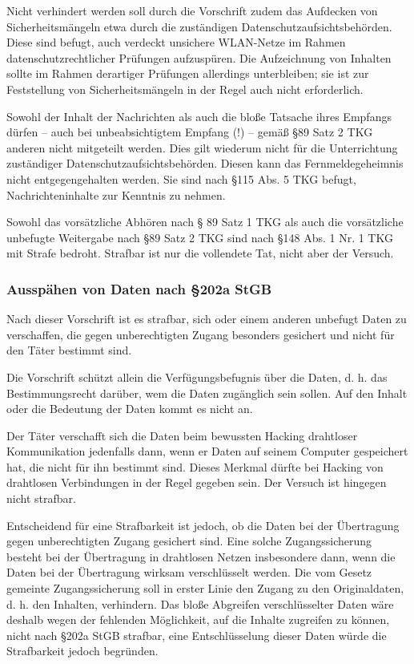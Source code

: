 \documentclass[10pt,a4paper]{article}
\begin{document}
Nicht verhindert werden soll durch die Vorschrift zudem das Aufdecken von Sicherheitsmängeln etwa durch die zuständigen Datenschutzaufsichtsbehörden. Diese sind befugt, auch verdeckt unsichere WLAN-Netze im Rahmen datenschutzrechtlicher Prüfungen aufzuspüren. Die Aufzeichnung von Inhalten sollte im Rahmen derartiger Prüfungen allerdings unterbleiben; sie ist zur Feststellung von Sicherheitsmängeln in der Regel auch nicht erforderlich.

Sowohl der Inhalt der Nachrichten als auch die bloße Tatsache ihres Empfangs dürfen – auch bei unbeabsichtigtem Empfang (!) – gemäß §89 Satz 2 TKG anderen nicht mitgeteilt werden. Dies gilt wiederum nicht für die Unterrichtung zuständiger Datenschutzaufsichtsbehörden. Diesen kann das Fernmeldegeheimnis nicht entgegengehalten werden. Sie sind nach §115 Abs. 5 TKG befugt, Nachrichteninhalte zur Kenntnis zu nehmen.

Sowohl das vorsätzliche Abhören nach § 89 Satz 1 TKG als auch die vorsätzliche unbefugte Weitergabe nach §89 Satz 2 TKG sind nach §148 Abs. 1 Nr. 1 TKG mit Strafe bedroht. Strafbar ist nur die vollendete Tat, nicht aber der Versuch.
 
\subsubsection*{Ausspähen von Daten nach §202a StGB}
Nach dieser Vorschrift ist es strafbar, sich oder einem anderen unbefugt Daten zu verschaffen, die gegen unberechtigten Zugang besonders gesichert und nicht für den Täter bestimmt sind.

Die Vorschrift schützt allein die Verfügungsbefugnis über die Daten, d. h. das Bestimmungsrecht darüber, wem die Daten zugänglich sein sollen. Auf den Inhalt oder die Bedeutung der Daten kommt es nicht an.

Der Täter verschafft sich die Daten beim bewussten Hacking drahtloser Kommunikation jedenfalls dann, wenn er Daten auf seinem Computer gespeichert hat, die nicht für ihn bestimmt sind. Dieses Merkmal dürfte bei Hacking von drahtlosen Verbindungen in der Regel gegeben sein. Der Versuch ist hingegen nicht strafbar.

Entscheidend für eine Strafbarkeit ist jedoch, ob die Daten bei der Übertragung gegen unberechtigten Zugang gesichert sind. Eine solche Zugangssicherung besteht bei der Übertragung in drahtlosen Netzen insbesondere dann, wenn die Daten bei der Übertragung wirksam verschlüsselt werden. Die vom Gesetz gemeinte Zugangssicherung soll in erster Linie den Zugang zu den Originaldaten, d. h. den Inhalten, verhindern. Das bloße Abgreifen verschlüsselter Daten wäre deshalb wegen der fehlenden Möglichkeit, auf die Inhalte zugreifen zu können, nicht nach §202a StGB strafbar, eine Entschlüsselung dieser Daten würde die Strafbarkeit jedoch begründen.
\end{document}
